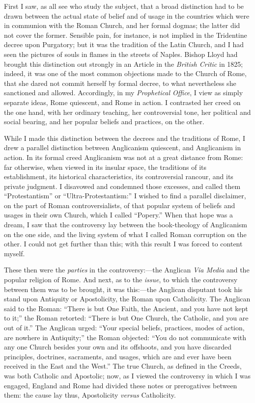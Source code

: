 First I saw, as all see who study the subject, that a broad
distinction had to be drawn between the actual state of belief and of
usage in the countries which were in communion with the Roman Church,
and her formal dogmas; the latter did not cover the former. Sensible
pain, for instance, is not implied in the Tridentine decree upon
Purgatory; but it was the tradition of the Latin Church, and I had seen
the pictures of souls in flames in the streets of Naples. Bishop Lloyd
had brought this distinction out strongly in an Article in the \emph{British
Critic} in 1825; indeed, it was one of the most common objections made to
the Church of Rome, that she dared not commit herself by formal decree,
to what nevertheless she sanctioned and allowed. Accordingly, in my \emph{Prophetical
Office}, I view as simply
separate ideas, Rome quiescent, and Rome in action. I contrasted her
creed on the one hand, with her ordinary teaching, her controversial
tone, her political and social bearing, and her popular beliefs and
practices, on the other.

While I made this distinction between the decrees and the traditions
of Rome, I drew a parallel distinction between Anglicanism quiescent,
and Anglicanism in action. In its formal creed Anglicanism was not at a
great distance from Rome: far otherwise, when viewed in its insular
space, the traditions of its establishment, its historical
characteristics, its controversial rancour, and its private judgment. I
disavowed and condemned those excesses, and called them
``Protestantism'' or ``Ultra-Protestantism:'' I wished
to find a parallel disclaimer, on the part of Roman controversialists,
of that popular system of beliefs and usages in their own Church, which
I called ``Popery.'' When that hope was a dream, I saw that the
controversy lay between the book-theology of Anglicanism on the one
side, and the living system of what I called Roman corruption on the
other. I could not get further than this; with this result I was forced
to content myself.

These then were the \emph{parties} in the controversy:—the Anglican \emph{Via
Media} and the popular religion of Rome. And next, as to the \emph{issue},
to which the controversy between them was to be brought, it was this:—the Anglican disputant took his stand upon Antiquity or
Apostolicity, the Roman upon Catholicity. The Anglican said to the
Roman: ``There is but One Faith, the Ancient, and you have not kept
to it;'' the Roman retorted: ``There is but One Church, the
Catholic, and you are out of it.'' The Anglican urged: ``Your
special beliefs, practices, modes of action, are nowhere in
Antiquity;'' the Roman objected: ``You do not communicate with
any one Church besides your own and its offshoots, and you have
discarded principles, doctrines, sacraments, and usages, which are and
ever have been received in the East and the West.'' The true Church,
as defined in the Creeds, was both Catholic and Apostolic; now, as I
viewed the controversy in which I was engaged, England and Rome had
divided these notes or prerogatives between them: the cause lay
thus, Apostolicity \emph{versus} Catholicity.

